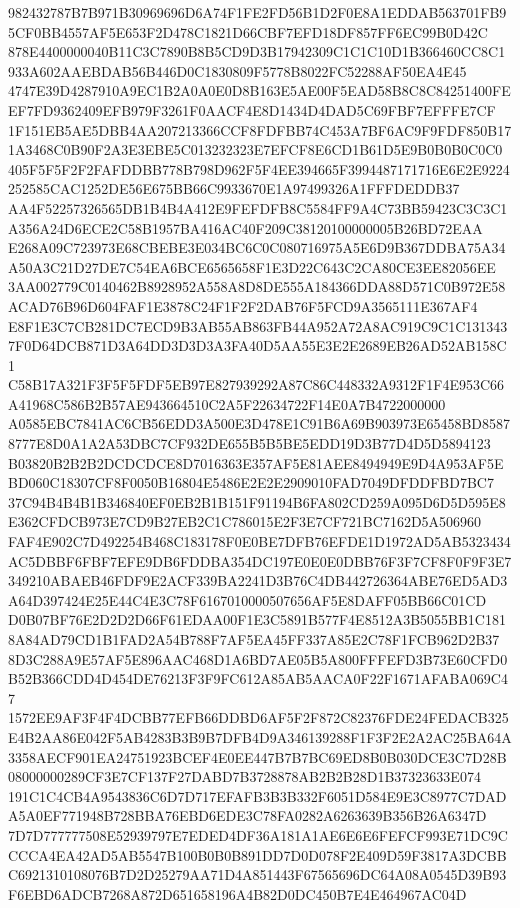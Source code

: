 \documentclass[UTF8,fontset=fandol,zihao=-4,a4paper]{ctexart}
\begin{document}
{{982432787B7B971B30969696D6A74F1FE2FD56B1D2F0E8A1EDDAB563701FB95CF0BB4557AF5E653F2D478C1821D66CBF7EFD18DF857FF6EC99B0D42C
878E4400000040B11C3C7890B8B5CD9D3B17942309C1C1C10D1B366460CC8C1933A602AAEBDAB56B446D0C1830809F5778B8022FC52288AF50EA4E45
4747E39D4287910A9EC1B2A0A0E0D8B163E5AE00F5EAD58B8C8C84251400FEEF7FD9362409EFB979F3261F0AACF4E8D1434D4DAD5C69FBF7EFFFE7CF
1F151EB5AE5DBB4AA207213366CCF8FDFBB74C453A7BF6AC9F9FDF850B171A3468C0B90F2A3E3EBE5C013232323E7EFCF8E6CD1B61D5E9B0B0B0C0C0
405F5F5F2F2FAFDDBB778B798D962F5F4EE394665F3994487171716E6E2E9224252585CAC1252DE56E675BB66C9933670E1A97499326A1FFFDEDDB37
AA4F52257326565DB1B4B4A412E9FEFDFB8C5584FF9A4C73BB59423C3C3C1A356A24D6ECE2C58B1957BA416AC40F209C38120100000005B26BD72EAA
E268A09C723973E68CBEBE3E034BC6C0C080716975A5E6D9B367DDBA75A34A50A3C21D27DE7C54EA6BCE6565658F1E3D22C643C2CA80CE3EE82056EE
3AA002779C0140462B8928952A558A8D8DE555A184366DDA88D571C0B972E58ACAD76B96D604FAF1E3878C24F1F2F2DAB76F5FCD9A3565111E367AF4
E8F1E3C7CB281DC7ECD9B3AB55AB863FB44A952A72A8AC919C9C1C1313437F0D64DCB871D3A64DD3D3D3A3FA40D5AA55E3E2E2689EB26AD52AB158C1
C58B17A321F3F5F5FDF5EB97E827939292A87C86C448332A9312F1F4E953C66A41968C586B2B57AE943664510C2A5F22634722F14E0A7B4722000000
A0585EBC7841AC6CB56EDD3A500E3D478E1C91B6A69B903973E65458BD85878777E8D0A1A2A53DBC7CF932DE655B5B5BE5EDD19D3B77D4D5D5894123
B03820B2B2B2DCDCDCE8D7016363E357AF5E81AEE8494949E9D4A953AF5EBD060C18307CF8F0050B16804E5486E2E2E2909010FAD7049DFDDFBD7BC7
37C94B4B4B1B346840EF0EB2B1B151F91194B6FA802CD259A095D6D5D595E8E362CFDCB973E7CD9B27EB2C1C786015E2F3E7CF721BC7162D5A506960
FAF4E902C7D492254B468C183178F0E0BE7DFB76EFDE1D1972AD5AB5323434AC5DBBF6FBF7EFE9DB6FDDBA354DC197E0E0E0DBB76F3F7CF8F0F9F3E7
349210ABAEB46FDF9E2ACF339BA2241D3B76C4DB442726364ABE76ED5AD3A64D397424E25E44C4E3C78F6167010000507656AF5E8DAFF05BB66C01CD
D0B07BF76E2D2D2D66F61EDAA00F1E3C5891B577F4E8512A3B5055BB1C1818A84AD79CD1B1FAD2A54B788F7AF5EA45FF337A85E2C78F1FCB962D2B37
8D3C288A9E57AF5E896AAC468D1A6BD7AE05B5A800FFFEFD3B73E60CFD0B52B366CDD4D454DE76213F3F9FC612A85AB5AACA0F22F1671AFABA069C47
1572EE9AF3F4F4DCBB77EFB66DDBD6AF5F2F872C82376FDE24FEDACB325E4B2AA86E042F5AB4283B3B9B7DFB4D9A346139288F1F3F2E2A2AC25BA64A
3358AECF901EA24751923BCEF4E0EE447B7B7BC69ED8B0B030DCE3C7D28B08000000289CF3E7CF137F27DABD7B3728878AB2B2B28D1B37323633E074
191C1C4CB4A9543836C6D7D717EFAFB3B3B332F6051D584E9E3C8977C7DADA5A0EF771948B728BBA76EBD6EDE3C78FA0282A6263639B356B26A6347D
7D7D777777508E52939797E7EDED4DF36A181A1AE6E6E6FEFCF993E71DC9CCCCA4EA42AD5AB5547B100B0B0B891DD7D0D078F2E409D59F3817A3DCBB
C6921310108076B7D2D25279AA71D4A851443F67565696DC64A08A0545D39B93F6EBD6ADCB7268A872D651658196A4B82D0DC450B7E4E464967AC04D
}}
\end{document}
